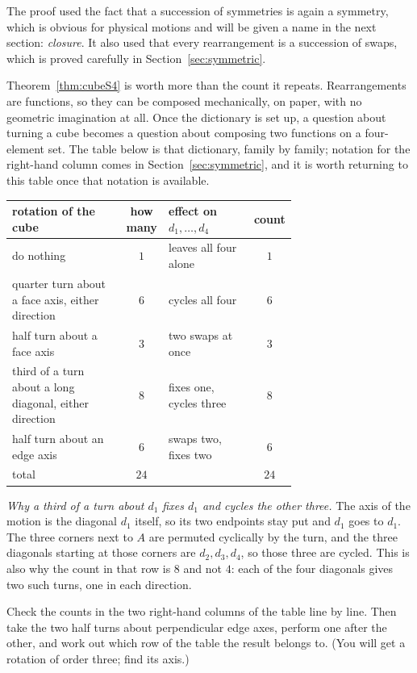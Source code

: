 \begin{rem}
The proof used the fact that a succession of symmetries is again a symmetry, which is obvious for
physical motions and will be given a name in the next section: \emph{closure}. It also used that
every rearrangement is a succession of swaps, which is proved carefully in
Section~\ref{sec:symmetric}.
\end{rem}

Theorem~\ref{thm:cubeS4} is worth more than the count it repeats. Rearrangements are functions, so
they can be composed mechanically, on paper, with no geometric imagination at all. Once the
dictionary is set up, a question about turning a cube becomes a question about composing two
functions on a four-element set. The table below is that dictionary, family by family; notation for
the right-hand column comes in Section~\ref{sec:symmetric}, and it is worth returning to this table
once that notation is available.

\begin{center}
\small
\begin{tabular}{@{}p{0.40\linewidth}cp{0.30\linewidth}c@{}}
\toprule
rotation of the cube & how many & effect on $d_1,\dots,d_4$ & count\\
\midrule
do nothing & $1$ & leaves all four alone & $1$\\
quarter turn about a face axis, either direction & $6$ & cycles all four & $6$\\
half turn about a face axis & $3$ & two swaps at once & $3$\\
third of a turn about a long diagonal, either direction & $8$ & fixes one, cycles three & $8$\\
half turn about an edge axis & $6$ & swaps two, fixes two & $6$\\
\midrule
total & $24$ & & $24$\\
\bottomrule
\end{tabular}
\end{center}

\begin{why}
\emph{Why a third of a turn about $d_1$ fixes $d_1$ and cycles the other three.} The axis of the
motion is the diagonal $d_1$ itself, so its two endpoints stay put and $d_1$ goes to $d_1$. The
three corners next to $A$ are permuted cyclically by the turn, and the three diagonals starting at
those corners are $d_2,d_3,d_4$, so those three are cycled. This is also why the count in that row
is $8$ and not $4$: each of the four diagonals gives two such turns, one in each direction.
\end{why}

\begin{tryit}
Check the counts in the two right-hand columns of the table line by line. Then take the two half
turns about perpendicular edge axes, perform one after the other, and work out which row of the
table the result belongs to. (You will get a rotation of order three; find its axis.)
\end{tryit}
